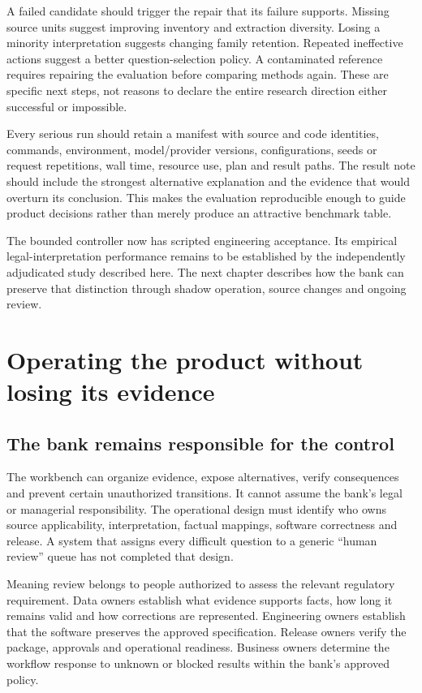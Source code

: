 \documentclass[12pt,a4paper,oneside,openany]{book}
\begin{document}
A failed candidate should trigger the repair that its failure supports. Missing
source units suggest improving inventory and extraction diversity. Losing a
minority interpretation suggests changing family retention. Repeated ineffective
actions suggest a better question-selection policy. A contaminated reference
requires repairing the evaluation before comparing methods again. These are
specific next steps, not reasons to declare the entire research direction either
successful or impossible.

Every serious run should retain a manifest with source and code identities,
commands, environment, model/provider versions, configurations, seeds or request
repetitions, wall time, resource use, plan and result paths. The result note should
include the strongest alternative explanation and the evidence that would overturn
its conclusion. This makes the evaluation reproducible enough to guide product
decisions rather than merely produce an attractive benchmark table.

The bounded controller now has scripted engineering acceptance. Its
empirical legal-interpretation performance remains to be established by
the independently adjudicated study described here. The next chapter describes how the bank
can preserve that distinction through shadow operation, source changes and
ongoing review.


\chapter{Operating the product without losing its evidence}
\label{ch:operation}

\section{The bank remains responsible for the control}
\label{merge:M10:00}


The workbench can organize evidence, expose alternatives, verify consequences and
prevent certain unauthorized transitions. It cannot assume the bank's legal or
managerial responsibility. The operational design must identify who owns source
applicability, interpretation, factual mappings, software correctness and release.
A system that assigns every difficult question to a generic ``human review'' queue
has not completed that design.

Meaning review belongs to people authorized to assess the relevant regulatory
requirement. Data owners establish what evidence supports facts, how long it
remains valid and how corrections are represented. Engineering owners establish
that the software preserves the approved specification. Release owners verify the
package, approvals and operational readiness. Business owners determine the
workflow response to unknown or blocked results within the bank's approved policy.
\end{document}
